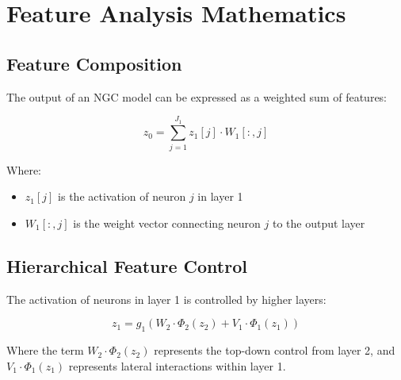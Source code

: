 \documentclass{article}
\begin{document}
\section{Feature Analysis Mathematics}

\subsection{Feature Composition}

The output of an NGC model can be expressed as a weighted sum of features:

\begin{equation}
  z_0 = \sum_{j=1}^{J_1} z_1[j] \cdot W_1[:,j]
\end{equation}

Where:
\begin{itemize}
  \item $z_1[j]$ is the activation of neuron $j$ in layer 1
  \item $W_1[:,j]$ is the weight vector connecting neuron $j$ to the output layer
\end{itemize}

\subsection{Hierarchical Feature Control}

The activation of neurons in layer 1 is controlled by higher layers:

\begin{equation}
  z_1 = g_1(W_2 \cdot \Phi_2(z_2) + V_1 \cdot \Phi_1(z_1))
\end{equation}

Where the term $W_2 \cdot \Phi_2(z_2)$ represents the top-down control from layer 2, and $V_1 \cdot \Phi_1(z_1)$ represents lateral interactions within layer 1.
\end{document}
